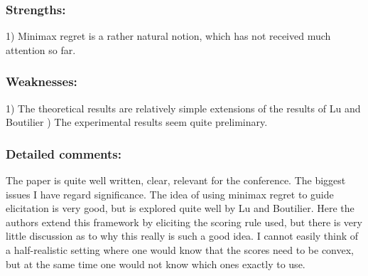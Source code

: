 \documentclass[version=3.21, pagesize, twoside=off, bibliography=totoc, DIV=calc, fontsize=12pt, a4paper]{scrartcl}
\begin{document}
\subsubsection*{Strengths:}	1) Minimax regret is a rather natural notion, which has not received much attention so far.
\subsubsection*{Weaknesses:}
1) The theoretical results are relatively simple extensions of the results of Lu and Boutilier
) The experimental results seem quite preliminary.

\subsubsection*{Detailed comments:}	The paper is quite well written, clear, relevant for the conference. The biggest issues I have regard significance. The idea of using minimax regret to guide elicitation is very good, but is explored quite well by Lu and Boutilier. Here the authors extend this framework by eliciting the scoring rule used, but there is very little discussion as to why this really is such a good idea. I cannot easily think of a half-realistic setting where one would know that the scores need to be convex, but at the same time one would not know which ones exactly to use.
\end{document}
